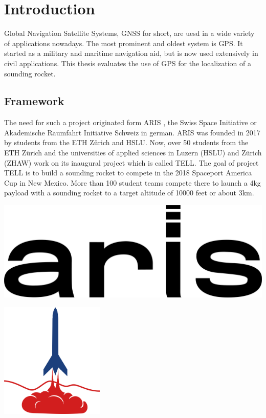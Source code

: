 \chapter{Introduction}

Global Navigation Satellite Systems, GNSS for short, are uesd in a wide variety of applications nowadays.
The most prominent and oldest system is GPS.
It started as a military and maritime navigation aid, but is now used extensively in civil applications.
This thesis evaluates the use of GPS for the localization of a sounding rocket.

\section{Framework}

The need for such a project originated form ARIS \cite{aris}, the Swiss Space Initiative or Akademische Raumfahrt Initiative Schweiz in german.
ARIS was founded in 2017 by students from the ETH Z\"urich and HSLU.
Now, over 50 students from the ETH Z\"urich and the universities of applied sciences in Luzern (HSLU) and Z\"urich (ZHAW) work on its inaugural project which is called TELL.
The goal of project TELL is to build a sounding rocket to compete in the 2018 Spaceport America Cup in New Mexico.
More than 100 student teams compete there to launch a 4kg payload with a sounding rocket to a target altitude of 10000 feet or about 3km.

\noindent
\begin{minipage}{0.5\textwidth}
 \centering
 \includegraphics[width=\textwidth]{images/ARIS.png}
\end{minipage}
\begin{minipage}{0.5\textwidth}
 \centering
 \includegraphics[height=5.5cm]{images/SAC_Logo.png}
\end{minipage}

